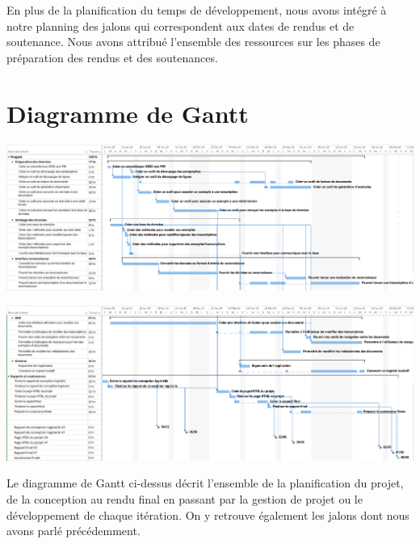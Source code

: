 En plus de la planification du temps de développement, nous avons intégré à notre planning des jalons qui correspondent aux dates de rendus et de soutenance. Nous avons attribué l’ensemble des ressources sur les phases de préparation des rendus et des soutenances.

\section{Diagramme de Gantt}

\begin{mdframed}[frametitle={Figure 3 : Diagramme de Gantt du projet (1/2)}, innerbottommargin=10]
\begin{center}
\includegraphics[scale=0.35]{gantt_V2.1.PNG}
\end{center}
\end{mdframed}

\begin{mdframed}[frametitle={Figure 4 : Diagramme de Gantt du projet (2/2)}, innerbottommargin=10]
\begin{center}
\includegraphics[scale=0.35]{gantt_V2.2.PNG}
\end{center}
\end{mdframed}

Le diagramme de Gantt ci-dessus décrit l’ensemble de la planification du projet, de la conception au rendu final en passant par la gestion de projet ou le développement de chaque itération. On y retrouve également les jalons dont nous avons parlé précédemment.

